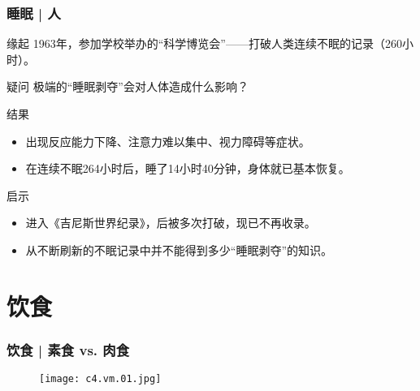 \begin{frame}
  \frametitle{睡眠 | 人}
  \begin{block}{缘起}
    1963年，参加学校举办的“科学博览会”——打破人类连续不眠的记录（260小时）。
  \end{block}
  \pause
  \begin{block}{疑问}
    极端的“睡眠剥夺”会对人体造成什么影响？
  \end{block}
  \pause
  \begin{block}{结果}
    \begin{itemize}
      \item 出现反应能力下降、注意力难以集中、视力障碍等症状。
      \item 在连续不眠264小时后，睡了14小时40分钟，身体就已基本恢复。
    \end{itemize}
  \end{block}
  \pause
  \begin{block}{启示}
    \begin{itemize}
      \item 进入《吉尼斯世界纪录》，后被多次打破，现已不再收录。
      \item 从不断刷新的不眠记录中并不能得到多少“睡眠剥夺”的知识。
    \end{itemize}
  \end{block}
\end{frame}

\section{饮食}
\begin{frame}
  \frametitle{饮食 | 素食 vs. 肉食}
  \begin{figure}
    \centering
    \texttt{[image: c4.vm.01.jpg]}
  \end{figure}
\end{frame}

